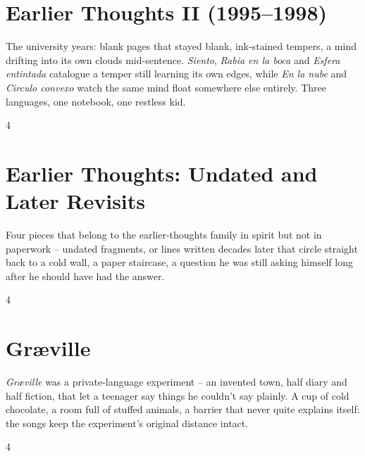\documentclass[a4paper,landscape]{memoir}
\begin{document}
\chapter{Earlier Thoughts II (1995–1998)}
The university years: blank pages that stayed blank, ink-stained tempers, a mind drifting into its own clouds mid-sentence. \emph{Siento}, \emph{Rabia en la boca} and \emph{Esfera entintada} catalogue a temper still learning its own edges, while \emph{En la nube} and \emph{Circulo convexo} watch the same mind float somewhere else entirely. Three languages, one notebook, one restless kid.
\clearpage\begin{multicols*}{4}



















\end{multicols*}

\chapter{Earlier Thoughts: Undated and Later Revisits}
Four pieces that belong to the earlier-thoughts family in spirit but not in paperwork -- undated fragments, or lines written decades later that circle straight back to a cold wall, a paper staircase, a question he was still asking himself long after he should have had the answer.
\clearpage\begin{multicols*}{4}




\end{multicols*}

\chapter{Gr\ae ville}
\emph{Græville} was a private-language experiment -- an invented town, half diary and half fiction, that let a teenager say things he couldn't say plainly. A cup of cold chocolate, a room full of stuffed animals, a barrier that never quite explains itself: the songs keep the experiment's original distance intact.
\clearpage\begin{multicols*}{4}









\end{multicols*}
\end{document}
